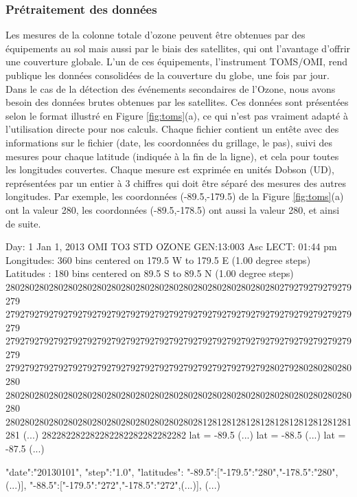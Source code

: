 \subsubsection*{Prétraitement des données}

Les mesures de la colonne totale d'ozone peuvent être obtenues par des équipements au sol mais aussi par le biais des satellites, qui ont l'avantage d'offrir une couverture globale. L'un de ces équipements, l'instrument TOMS/OMI, rend publique les données consolidées de la couverture du globe, une fois par jour. Dans le cas de la détection des événements secondaires de l'Ozone, nous avons besoin des données brutes obtenues par les satellites. Ces données sont présentées selon le format illustré en Figure \ref{fig:toms}(a), ce qui n'est pas vraiment adapté à l'utilisation directe pour nos calculs. Chaque fichier contient un entête avec des informations sur le fichier (date, les coordonnées du grillage, le pas), suivi des mesures pour chaque latitude (indiquée à la fin de la ligne), et cela pour toutes les longitudes couvertes. Chaque mesure est exprimée en unités Dobson (UD), représentées par un entier à 3 chiffres qui doit être séparé des mesures des autres longitudes. Par exemple, les coordonnées (-89.5,-179.5) de la Figure \ref{fig:toms}(a) ont la valeur 280, les coordonnées (-89.5,-178.5) ont aussi la valeur 280, et ainsi de suite.   

\begin{myverbbox}[\tiny]{\TOMS}
	Day:   1 Jan  1, 2013    OMI TO3    STD OZONE    GEN:13:003 Asc LECT: 01:44 pm 
	Longitudes:  360 bins centered on 179.5  W  to 179.5  E   (1.00 degree steps)
	Latitudes :  180 bins centered on  89.5  S  to  89.5  N   (1.00 degree steps)
	280280280280280280280280280280280280280280280280280280280279279279279279279
	279279279279279279279279279279279279279279279279279279279279279279279279279
	279279279279279279279279279279279279279279279279279279279279279279279279279
	279279279279279279279279279279279279279279279279279279280279280280280280280
	280280280280280280280280280280280280280280280280280280280280280280280280280
	280280280280280280280280280280280280280281281281281281281281281281281281281
	(...)
	282282282282282282282282282282   lat =  -89.5
	(...)   lat =  -88.5
	(...)   lat =  -87.5
	(...)
\end{myverbbox}

\begin{myverbbox}[\tiny]{\JSON}
	{
		"date":"20130101",
		"step":"1.0",
		"latitudes":{
			"-89.5":["-179.5":"280","-178.5":"280",(...)],
			"-88.5":["-179.5":"272","-178.5":"272",(...)],
			(...)
		}
	}
\end{myverbbox}

